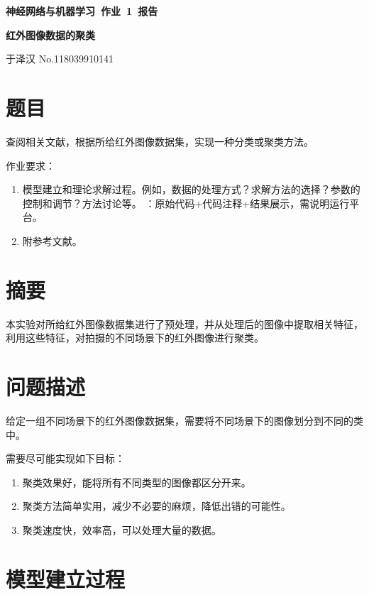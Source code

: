 \documentclass[a4paper, 12pt]{article}
\begin{document}
\begin{center}
{\bfseries {神经网络与机器学习~作业~1~报告}}

{\bfseries {红外图像数据的聚类}}

\vspace{0.5\baselineskip}

{ \kaishu 于泽汉 \hspace{1em} \textsf{No.118039910141}}
\end{center}


\section{题目}

查阅相关文献，根据所给红外图像数据集，实现一种分类或聚类方法。

作业要求：
\begin{enumerate}[leftmargin=*,labelindent=2em]
\item 模型建立和理论求解过程。例如，数据的处理方式？求解方法的选择？参数的控制和调节？方法讨论等。 
：原始代码+代码注释+结果展示，需说明运行平台。
\item 附参考文献。
\end{enumerate}


\section{摘要}
本实验对所给红外图像数据集进行了预处理，并从处理后的图像中提取相关特征，利用这些特征，对拍摄的不同场景下的红外图像进行聚类。


\section{问题描述}

给定一组不同场景下的红外图像数据集，需要将不同场景下的图像划分到不同的类中。

需要尽可能实现如下目标：

\begin{enumerate}[leftmargin=*,labelindent=2em]
\item 聚类效果好，能将所有不同类型的图像都区分开来。
\item 聚类方法简单实用，减少不必要的麻烦，降低出错的可能性。
\item 聚类速度快，效率高，可以处理大量的数据。
\end{enumerate}

\section{模型建立过程}
\end{document}
